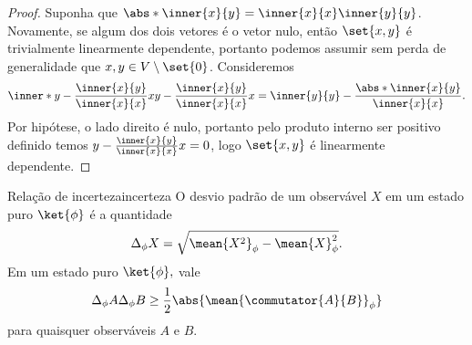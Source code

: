 \begin{proof}
    Suponha que \(\abs*{\inner{x}{y}} = \inner{x}{x} \inner{y}{y}\). Novamente, se algum dos dois vetores é o vetor nulo, então \(\set{x,y}\) é trivialmente linearmente dependente, portanto podemos assumir sem perda de generalidade que \(x, y \in V \setminus\set{0}\). Consideremos
    \begin{equation*}
        \inner*{y - \frac{\inner{x}{y}}{\inner{x}{x}}x}{y - \frac{\inner{x}{y}}{\inner{x}{x}}x} = \inner{y}{y} - \frac{\abs*{\inner{x}{y}}}{\inner{x}{x}}.
    \end{equation*}
    Por hipótese, o lado direito é nulo, portanto pelo produto interno ser positivo definido temos \(y - \frac{\inner{x}{y}}{\inner{x}{x}}x = 0\), logo \(\set{x,y}\) é linearmente dependente.
\end{proof}

\begin{lemma}{Relação de incerteza}{incerteza}
    O desvio padrão de um observável \(X\) em um estado puro \(\ket{\phi}\) é a quantidade
    \begin{equation*}
        \Delta_\phi X = \sqrt{\mean{X^2}_\phi - \mean{X}^2_\phi}.
    \end{equation*}
    Em um estado puro \(\ket{\phi},\) vale
    \begin{equation*}
        \Delta_\phi A \Delta_\phi B \geq \frac12 \abs{\mean{\commutator{A}{B}}_\phi}
    \end{equation*}
    para quaisquer observáveis \(A\) e \(B\).
\end{lemma}
